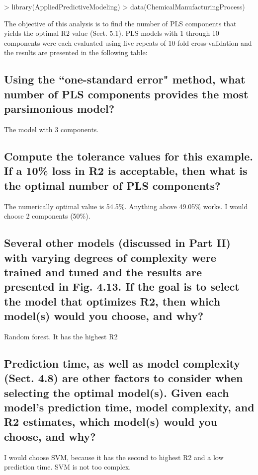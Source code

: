 \documentclass[12pt]{article}
\begin{document}
\begin{Schunk}
\begin{Sinput}
> library(AppliedPredictiveModeling)
> data(ChemicalManufacturingProcess)
\end{Sinput}
\end{Schunk}
The objective of this analysis is to find the number of PLS components
that yields the optimal R2 value (Sect. 5.1). PLS models with 1 through 10
components were each evaluated using five repeats of 10-fold cross-validation
and the results are presented in the following table:

\subsection{Using the ``one-standard error" method, what number of PLS components
provides the most parsimonious model?}
The model with 3 components.

\subsection{Compute the tolerance values for this example. If a 10\% loss in R2 is
acceptable, then what is the optimal number of PLS components?}
The numerically optimal value is 54.5\%. Anything above 49.05\% works. I would choose 2 components (50\%). 

\subsection{Several other models (discussed in Part II) with varying degrees of complexity
were trained and tuned and the results are presented in Fig. 4.13.
If the goal is to select the model that optimizes R2, then which model(s)
would you choose, and why?}

Random forest. It has the highest R2

\subsection{Prediction time, as well as model complexity (Sect. 4.8) are other factors
to consider when selecting the optimal model(s). Given each model’s prediction
time, model complexity, and R2 estimates, which model(s) would
you choose, and why?}

I would choose SVM, because it has the second to highest R2 and a low prediction time. SVM is not too complex.
\end{document}
